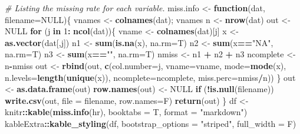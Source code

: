\documentclass[
  11pt,
]{article}
\newenvironment{Shaded}{\begin{snugshade}}{\end{snugshade}}
\newcommand{\AttributeTok}[1]{\textcolor[rgb]{0.13,0.29,0.53}{#1}}
\newcommand{\CommentTok}[1]{\textcolor[rgb]{0.56,0.35,0.01}{\textit{#1}}}
\newcommand{\ConstantTok}[1]{\textcolor[rgb]{0.56,0.35,0.01}{#1}}
\newcommand{\ControlFlowTok}[1]{\textcolor[rgb]{0.13,0.29,0.53}{\textbf{#1}}}
\newcommand{\DecValTok}[1]{\textcolor[rgb]{0.00,0.00,0.81}{#1}}
\newcommand{\FunctionTok}[1]{\textcolor[rgb]{0.13,0.29,0.53}{\textbf{#1}}}
\newcommand{\NormalTok}[1]{#1}
\newcommand{\OtherTok}[1]{\textcolor[rgb]{0.56,0.35,0.01}{#1}}
\newcommand{\SpecialCharTok}[1]{\textcolor[rgb]{0.81,0.36,0.00}{\textbf{#1}}}
\newcommand{\StringTok}[1]{\textcolor[rgb]{0.31,0.60,0.02}{#1}}
\begin{document}
\begin{Shaded}
\begin{Highlighting}[]
\CommentTok{\# Listing the missing rate for each variable.}
\NormalTok{miss.info }\OtherTok{\textless{}{-}} \ControlFlowTok{function}\NormalTok{(dat, }\AttributeTok{filename=}\ConstantTok{NULL}\NormalTok{)\{}
\NormalTok{  vnames }\OtherTok{\textless{}{-}} \FunctionTok{colnames}\NormalTok{(dat); vnames}
\NormalTok{  n }\OtherTok{\textless{}{-}} \FunctionTok{nrow}\NormalTok{(dat)}
\NormalTok{  out }\OtherTok{\textless{}{-}} \ConstantTok{NULL}
  \ControlFlowTok{for}\NormalTok{ (j }\ControlFlowTok{in} \DecValTok{1}\SpecialCharTok{:} \FunctionTok{ncol}\NormalTok{(dat))\{}
\NormalTok{    vname }\OtherTok{\textless{}{-}} \FunctionTok{colnames}\NormalTok{(dat)[j]}
\NormalTok{    x }\OtherTok{\textless{}{-}} \FunctionTok{as.vector}\NormalTok{(dat[,j])}
\NormalTok{    n1 }\OtherTok{\textless{}{-}} \FunctionTok{sum}\NormalTok{(}\FunctionTok{is.na}\NormalTok{(x), }\AttributeTok{na.rm=}\NormalTok{T)}
\NormalTok{    n2 }\OtherTok{\textless{}{-}} \FunctionTok{sum}\NormalTok{(x}\SpecialCharTok{==}\StringTok{"NA"}\NormalTok{, }\AttributeTok{na.rm=}\NormalTok{T)}
\NormalTok{    n3 }\OtherTok{\textless{}{-}} \FunctionTok{sum}\NormalTok{(x}\SpecialCharTok{==}\StringTok{""}\NormalTok{, }\AttributeTok{na.rm=}\NormalTok{T)}
\NormalTok{    nmiss }\OtherTok{\textless{}{-}}\NormalTok{ n1 }\SpecialCharTok{+}\NormalTok{ n2 }\SpecialCharTok{+}\NormalTok{ n3}
\NormalTok{    ncomplete }\OtherTok{\textless{}{-}}\NormalTok{ n}\SpecialCharTok{{-}}\NormalTok{nmiss}
\NormalTok{    out }\OtherTok{\textless{}{-}} \FunctionTok{rbind}\NormalTok{(out, }\FunctionTok{c}\NormalTok{(}\AttributeTok{col.number=}\NormalTok{j, }\AttributeTok{vname=}\NormalTok{vname, }
                        \AttributeTok{mode=}\FunctionTok{mode}\NormalTok{(x), }\AttributeTok{n.levels=}\FunctionTok{length}\NormalTok{(}\FunctionTok{unique}\NormalTok{(x)), }
                        \AttributeTok{ncomplete=}\NormalTok{ncomplete, }\AttributeTok{miss.perc=}\NormalTok{nmiss}\SpecialCharTok{/}\NormalTok{n))}
\NormalTok{  \}}
\NormalTok{  out }\OtherTok{\textless{}{-}} \FunctionTok{as.data.frame}\NormalTok{(out)}
  \FunctionTok{row.names}\NormalTok{(out) }\OtherTok{\textless{}{-}} \ConstantTok{NULL} 
  \ControlFlowTok{if}\NormalTok{ (}\SpecialCharTok{!}\FunctionTok{is.null}\NormalTok{(filename)) }\FunctionTok{write.csv}\NormalTok{(out, }\AttributeTok{file =}\NormalTok{ filename, }\AttributeTok{row.names=}\NormalTok{F)}
  \FunctionTok{return}\NormalTok{(out)}
\NormalTok{\}}
\NormalTok{df }\OtherTok{\textless{}{-}}\NormalTok{ knitr}\SpecialCharTok{::}\FunctionTok{kable}\NormalTok{(}\FunctionTok{miss.info}\NormalTok{(hr), }\AttributeTok{booktabs =}\NormalTok{ T, }\AttributeTok{format =} \StringTok{"markdown"}\NormalTok{) }
\NormalTok{kableExtra}\SpecialCharTok{::}\FunctionTok{kable\_styling}\NormalTok{(df, }\AttributeTok{bootstrap\_options =} \StringTok{"striped"}\NormalTok{, }\AttributeTok{full\_width =}\NormalTok{ F)}
\end{Highlighting}
\end{Shaded}
\end{document}
